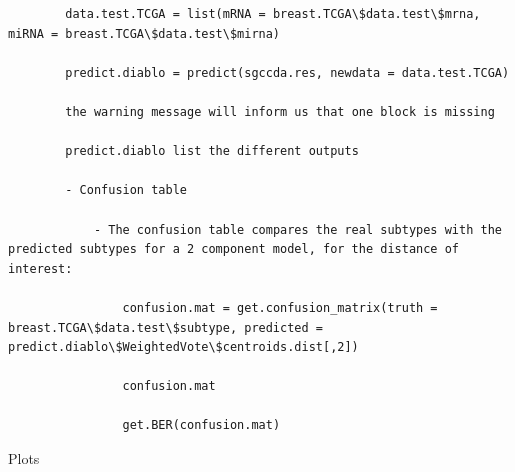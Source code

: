 \documentclass[
]{book}
\begin{document}
\begin{verbatim}
        data.test.TCGA = list(mRNA = breast.TCGA\$data.test\$mrna, miRNA = breast.TCGA\$data.test\$mirna)

        predict.diablo = predict(sgccda.res, newdata = data.test.TCGA)

        the warning message will inform us that one block is missing

        predict.diablo list the different outputs

        - Confusion table

            - The confusion table compares the real subtypes with the predicted subtypes for a 2 component model, for the distance of interest:

                confusion.mat = get.confusion_matrix(truth = breast.TCGA\$data.test\$subtype, predicted = predict.diablo\$WeightedVote\$centroids.dist[,2])

                confusion.mat

                get.BER(confusion.mat)
\end{verbatim}

Plots
\end{document}
